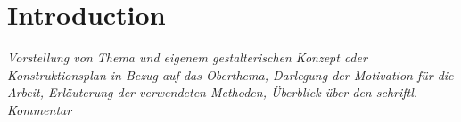 \chapter{Introduction}
\label{cha:Introduction}
\textit{Vorstellung von Thema und eigenem gestalterischen Konzept oder Konstruktionsplan in Bezug auf das Oberthema, Darlegung der Motivation für die Arbeit, Erläuterung der verwendeten Methoden, Überblick über den schriftl. Kommentar}